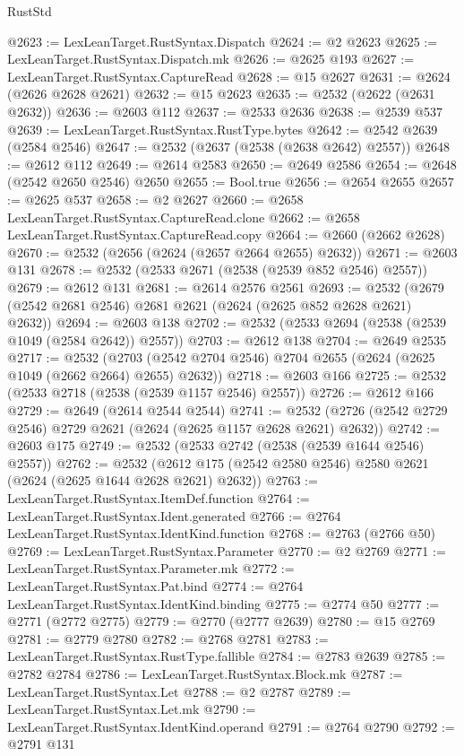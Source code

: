 \begin{lexlean}{RustStd}
\begin{coremodule}
@2623 := LexLeanTarget.RustSyntax.Dispatch
@2624 := @2 @2623
@2625 := LexLeanTarget.RustSyntax.Dispatch.mk
@2626 := @2625 @193
@2627 := LexLeanTarget.RustSyntax.CaptureRead
@2628 := @15 @2627
@2631 := @2624 (@2626 @2628 @2621)
@2632 := @15 @2623
@2635 := @2532 (@2622 (@2631 @2632))
@2636 := @2603 @112
@2637 := @2533 @2636
@2638 := @2539 @537
@2639 := LexLeanTarget.RustSyntax.RustType.bytes
@2642 := @2542 @2639 (@2584 @2546)
@2647 := @2532 (@2637 (@2538 (@2638 @2642) @2557))
@2648 := @2612 @112
@2649 := @2614 @2583
@2650 := @2649 @2586
@2654 := @2648 (@2542 @2650 @2546) @2650
@2655 := Bool.true
@2656 := @2654 @2655
@2657 := @2625 @537
@2658 := @2 @2627
@2660 := @2658 LexLeanTarget.RustSyntax.CaptureRead.clone
@2662 := @2658 LexLeanTarget.RustSyntax.CaptureRead.copy
@2664 := @2660 (@2662 @2628)
@2670 := @2532 (@2656 (@2624 (@2657 @2664 @2655) @2632))
@2671 := @2603 @131
@2678 := @2532 (@2533 @2671 (@2538 (@2539 @852 @2546) @2557))
@2679 := @2612 @131
@2681 := @2614 @2576 @2561
@2693 := @2532 (@2679 (@2542 @2681 @2546) @2681 @2621 (@2624 (@2625 @852 @2628 @2621) @2632))
@2694 := @2603 @138
@2702 := @2532 (@2533 @2694 (@2538 (@2539 @1049 (@2584 @2642)) @2557))
@2703 := @2612 @138
@2704 := @2649 @2535
@2717 := @2532
    (@2703 (@2542 @2704 @2546) @2704 @2655 (@2624 (@2625 @1049 (@2662 @2664) @2655) @2632))
@2718 := @2603 @166
@2725 := @2532 (@2533 @2718 (@2538 (@2539 @1157 @2546) @2557))
@2726 := @2612 @166
@2729 := @2649 (@2614 @2544 @2544)
@2741 := @2532 (@2726 (@2542 @2729 @2546) @2729 @2621 (@2624 (@2625 @1157 @2628 @2621) @2632))
@2742 := @2603 @175
@2749 := @2532 (@2533 @2742 (@2538 (@2539 @1644 @2546) @2557))
@2762 := @2532 (@2612 @175 (@2542 @2580 @2546) @2580 @2621 (@2624 (@2625 @1644 @2628 @2621) @2632))
@2763 := LexLeanTarget.RustSyntax.ItemDef.function
@2764 := LexLeanTarget.RustSyntax.Ident.generated
@2766 := @2764 LexLeanTarget.RustSyntax.IdentKind.function
@2768 := @2763 (@2766 @50)
@2769 := LexLeanTarget.RustSyntax.Parameter
@2770 := @2 @2769
@2771 := LexLeanTarget.RustSyntax.Parameter.mk
@2772 := LexLeanTarget.RustSyntax.Pat.bind
@2774 := @2764 LexLeanTarget.RustSyntax.IdentKind.binding
@2775 := @2774 @50
@2777 := @2771 (@2772 @2775)
@2779 := @2770 (@2777 @2639)
@2780 := @15 @2769
@2781 := @2779 @2780
@2782 := @2768 @2781
@2783 := LexLeanTarget.RustSyntax.RustType.fallible
@2784 := @2783 @2639
@2785 := @2782 @2784
@2786 := LexLeanTarget.RustSyntax.Block.mk
@2787 := LexLeanTarget.RustSyntax.Let
@2788 := @2 @2787
@2789 := LexLeanTarget.RustSyntax.Let.mk
@2790 := LexLeanTarget.RustSyntax.IdentKind.operand
@2791 := @2764 @2790
@2792 := @2791 @131

\end{coremodule}
\end{lexlean}
